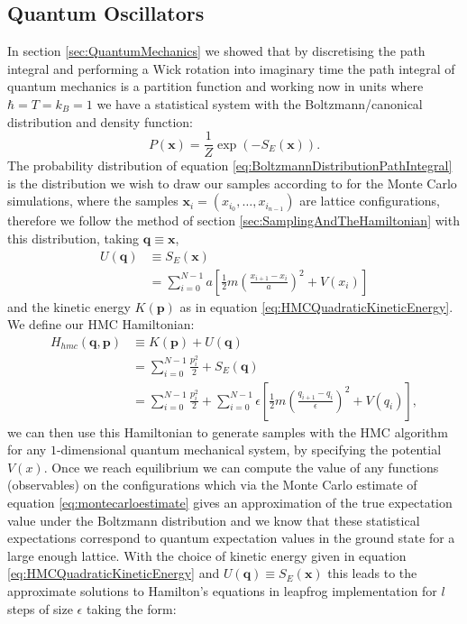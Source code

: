 \documentclass[12pt]{article}
\begin{document}
    \subsection{Quantum Oscillators}
    In section \ref{sec:QuantumMechanics} we showed that by discretising the path integral and performing a Wick rotation into imaginary time the path integral of quantum mechanics is a partition function and working now in units where $\hbar=T=k_B=1$ we have a statistical system with the Boltzmann/canonical distribution and density function:
    \begin{equation}
        \label{eq:BoltzmannDistributionPathIntegral}
        P\left(\bm{x}\right) = \frac{1}{Z}\exp{\left(-S_E\left(\bm{x}\right)\right)}.
    \end{equation}
    The probability distribution of equation \ref{eq:BoltzmannDistributionPathIntegral} is the distribution we wish to draw our samples according to for the Monte Carlo simulations, where the samples $\bm{x}_i=\left(x_{i_{0}},\dots,x_{i_{n-1}}\right)$ are lattice configurations, therefore we follow the method of section \ref{sec:SamplingAndTheHamiltonian} with this distribution, taking $\bm{q}\equiv\bm{x}$,
    \begin{align}
        \label{eq:QuantumHMCPotential}
        U\left(\bm{q}\right) & \equiv S_E\left(\bm{x}\right) \\
                             & = \sum_{i=0}^{N-1} a \left[\frac{1}{2}m\left(\frac{x_{i+1}-x_{i}}{a}\right)^2 + V(x_i)\right]
    \end{align} 
    and the kinetic energy $K\left(\bm{p}\right)$ as in equation \ref{eq:HMCQuadraticKineticEnergy}. We define our HMC Hamiltonian:
    \begin{align}
        \label{eq:HMCQuantumMechanicalHamiltonian1}
        H_{hmc}\left(\bm{q},\bm{p}\right) & \equiv K\left(\bm{p}\right) + U\left(\bm{q}\right)\\
        \label{eq:HMCQuantumMechanicalHamiltonian2} & = \sum_{i=0}^{N-1} \frac{p_i^2}{2} + S_E\left(\bm{q}\right) \\
        \label{eq:HMCQuantumMechanicalHamiltonian3}& = \sum_{i=0}^{N-1} \frac{p_i^2}{2} + \sum_{i=0}^{N-1} \epsilon \left[\frac{1}{2}m\left(\frac{q_{i+1}-q_{i}}{\epsilon}\right)^2 + V\left(q_i\right)\right],
    \end{align} 
    we can then use this Hamiltonian to generate samples with the HMC algorithm for any $1$-dimensional quantum mechanical system, by specifying the potential $V\left(x\right)$. Once we reach equilibrium we can compute the value of any functions (observables) on the configurations which via the Monte Carlo estimate of equation \ref{eq:montecarloestimate} gives an approximation of the true expectation value under the Boltzmann distribution and we know that these statistical expectations correspond to quantum expectation values in the ground state for a large enough lattice.  With the choice of kinetic energy given in equation \ref{eq:HMCQuadraticKineticEnergy} and $U\left(\bm{q}\right) \equiv S_E\left(\bm{x}\right)$ this leads to the approximate solutions to Hamilton's equations in leapfrog implementation for $l$ steps of size $\epsilon$ taking the form:
\end{document}
